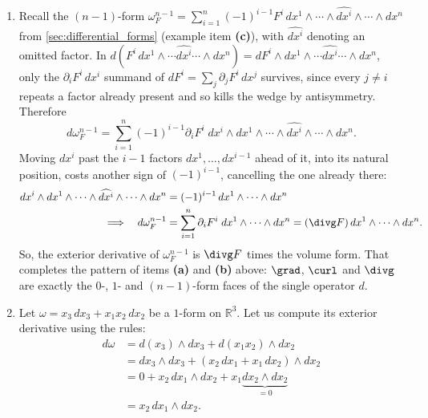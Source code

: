 \begin{example}
\begin{enumerate}[label=\textbf{(\alph*)}]
  \item Recall the $(n-1)$-form $\omega_F^{n-1} =
  \sum_{i=1}^n(-1)^{i-1}F^i\,dx^1\wedge\cdots\wedge\widehat{dx^i}\wedge\cdots\wedge dx^n$ from
  \cref{sec:differential_forms} (example item \textbf{(c)}), with $\widehat{dx^i}$ denoting an
  omitted factor. In $d(F^i\,dx^1\wedge\cdots\widehat{dx^i}\cdots\wedge dx^n) =
  dF^i\wedge dx^1\wedge\cdots\widehat{dx^i}\cdots\wedge dx^n$, only the $\partial_iF^i\,dx^i$
  summand of $dF^i = \sum_j\partial_jF^i\,dx^j$ survives, since every $j\neq i$ repeats a factor
  already present and so kills the wedge by antisymmetry. Therefore
  \[d\omega_F^{n-1} = \sum_{i=1}^n(-1)^{i-1}\partial_iF^i\;dx^i\wedge dx^1\wedge\cdots\wedge
    \widehat{dx^i}\wedge\cdots\wedge dx^n.\]
  Moving $dx^i$ past the $i-1$ factors $dx^1,\dots,dx^{i-1}$ ahead of it, into its natural
  position, costs another sign of $(-1)^{i-1}$, cancelling the one already there:
  \begin{align*}
    dx^i\wedge dx^1\wedge\cdots\wedge\widehat{dx^i}\wedge\cdots\wedge dx^n
      &= (-1)^{i-1}\,dx^1\wedge\cdots\wedge dx^n \\
    \Longrightarrow\quad
      d\omega_F^{n-1} &= \sum_{i=1}^n\partial_iF^i\;dx^1\wedge\cdots\wedge dx^n
      = (\divg F)\,dx^1\wedge\cdots\wedge dx^n.
  \end{align*}
  So, the exterior derivative of $\omega_F^{n-1}$ is $\divg F$ times the volume form. That
  completes the pattern of items \textbf{(a)} and \textbf{(b)} above: $\grad$, $\curl$ and
  $\divg$ are exactly the $0$-, $1$- and $(n-1)$-form faces of the single operator $d$.

  \item Let $\omega = x_3 \,dx_3 + x_1 x_2 \,dx_2$ be a $1$-form on $\mathbb{R}^3$. Let us compute its exterior derivative using the rules:
  \begin{align*}
  d\omega &= d(x_3) \wedge dx_3 + d(x_1 x_2) \wedge dx_2 \\
  &= dx_3 \wedge dx_3 + (x_2 \,dx_1 + x_1 \,dx_2) \wedge dx_2 \\
  &= 0 + x_2 \,dx_1 \wedge dx_2 + x_1 \underbrace{dx_2 \wedge dx_2}_{=0} \\
  &= x_2 \,dx_1 \wedge dx_2.
  \end{align*}
\end{enumerate}
\end{example}

